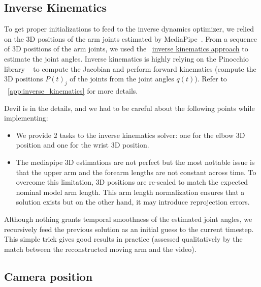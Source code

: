 \subsection{Inverse Kinematics}
\label{subsec:inverse_kinematics}
To get proper initializations to feed to the inverse dynamics optimizer, we relied on the 3D positions of the arm joints estimated by MediaPipe~\cite{lugaresi2019mediapipe}.
From a sequence of 3D positions of the arm joints, we used the 
~\href{https://github.com/balthazarneveu/monocular_pose_and_forces_estimation/blob/main/src/projectyl/dynamics/inverse_kinematics.py}{inverse kinematics approach} to estimate the joint angles.
Inverse kinematics is highly relying on the Pinocchio library ~\cite{carpentier2019pinocchio} to compute 
the Jacobian and perform forward kinematics (compute the 3D positions  $P(t)_{j}$ of the joints from the joint angles $q(t)$). Refer to ~\cref{app:inverse_kinematics} for more details.

Devil is in the details, and we had to be careful about the following points while implementing:
\begin{itemize}
    \item We provide 2 tasks to the inverse kinematics solver: one for the elbow 3D position and one for the wrist 3D position.
    \item The mediapipe 3D estimations are not perfect but the most nottable issue is that 
    the upper arm and the forearm lengths are not constant across time. To overcome this limitation,
    3D positions are re-scaled to match the expected nominal model arm length.
    This arm length normalization ensures that a solution exists but on the other hand, it may introduce reprojection errors.
\end{itemize}
Although nothing grants temporal smoothness of the estimated joint angles, we recursively feed the previous solution as an initial guess to the current timestep.
This simple trick gives good results in practice (assessed qualitatively by the match between the reconstructed moving arm and the video).


\subsection{Camera position}
\label{subsec:cam_estim}

